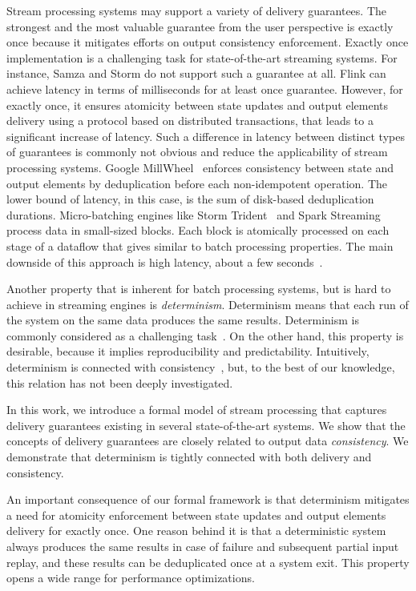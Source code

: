 Stream processing systems may support a variety of delivery guarantees. The strongest and the most valuable guarantee from the user perspective is exactly once because it mitigates efforts on output consistency enforcement. Exactly once implementation is a challenging task for state-of-the-art streaming systems. For instance, Samza and Storm do not support such a guarantee at all. Flink can achieve latency in terms of milliseconds for at least once guarantee. However, for exactly once, it ensures atomicity between state updates and output elements delivery using a protocol based on distributed transactions, that leads to a significant increase of latency. Such a difference in latency between distinct types of guarantees is commonly not obvious and reduce the applicability of stream processing systems. Google MillWheel~\cite{Akidau:2013:MFS:2536222.2536229} enforces consistency between state and output elements by deduplication before each non-idempotent operation. The lower bound of latency, in this case, is the sum of disk-based deduplication durations. Micro-batching engines like Storm Trident~\cite{apache:storm:trident} and Spark Streaming~\cite{Zaharia:2012:DSE:2342763.2342773} process data in small-sized blocks. Each block is atomically processed on each stage of a dataflow that gives similar to batch processing properties. The main downside of this approach is high latency, about a few seconds~\cite{7530084, 7474816}.

Another property that is inherent for batch processing systems, but is hard to achieve in streaming engines is {\em determinism}. Determinism means that each run of the system on the same data produces the same results. Determinism is commonly considered as a challenging task~\cite{Zacheilas:2017:MDS:3093742.3093921}. On the other hand, this property is desirable, because it implies reproducibility and predictability. Intuitively, determinism is connected with consistency~\cite{Stonebraker:2005:RRS:1107499.1107504}, but, to the best of our knowledge, this relation has not been deeply investigated. 

In this work, we introduce a formal model of stream processing that captures delivery guarantees existing in several state-of-the-art systems. We show that the concepts of delivery guarantees are closely related to output data {\em consistency}. We demonstrate that determinism is tightly connected with both delivery and consistency. 

An important consequence of our formal framework is that determinism mitigates a need for atomicity enforcement between state updates and output elements delivery for exactly once. One reason behind it is that a deterministic system always produces the same results in case of failure and subsequent partial input replay, and these results can be deduplicated once at a system exit. This property opens a wide range for performance optimizations.


